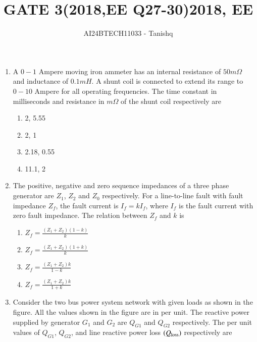 \documentclass[journal]{IEEEtran}
\begin{document}

\vspace{3cm}
\author{AI24BTECH11033 - Tanishq}
\title{GATE 3(2018,EE Q27-30)}
{\let\newpage\relax\maketitle}
\title{2018, EE}
\renewcommand{\thefigure}{\theenumi}
\renewcommand{\thetable}{\theenumi}
\setlength{\intextsep}{10pt} %
\renewcommand{\thetable}{\theenumi}
\begin{enumerate}
\item A $0-1$ Ampere moving iron ammeter has an internal resistance of $50 m\Omega$ and inductance of $0.1 mH$. A shunt coil is connected to extend its range to $0-10$ Ampere for all operating frequencies. The time constant in milliseconds and resistance in $m\Omega$ of the shunt coil respectively are
\begin{enumerate}
      \item 2, 5.55
      \item 2, 1
      \item 2.18, 0.55
      \item 11.1, 2
  \end{enumerate}
  \item The positive, negative and zero sequence impedances of a three phase generator are $Z_1$, $Z_2$ and $Z_0$ respectively. For a line-to-line fault with fault impedance $Z_f$, the fault current is $I_f = k I_f$, where $I_f$ is the fault current with zero fault impedance. The relation between $Z_f$ and $k$ is
\begin{enumerate}
    \item $Z_f = \frac{(Z_1 + Z_2)(1 - k)}{k}$
    \item $Z_f = \frac{(Z_1 + Z_2)(1 + k)}{k}$
    \item $Z_f = \frac{(Z_1 + Z_2) k}{1 - k}$
    \item $Z_f = \frac{(Z_1 + Z_2) k}{1 + k}$
\end{enumerate}
\item Consider the two bus power system network with given loads as shown in the figure. All the values shown in the figure are in per unit. The reactive power supplied by generator $G_1$ and $G_2$ are $Q_{G1}$ and $Q_{G2}$ respectively. The per unit values of $Q_{G1}$, $Q_{G2}$, and line reactive power loss $\left(Q_{\text{loss}}\right)$ respectively are

\end{enumerate}
\end{document}
